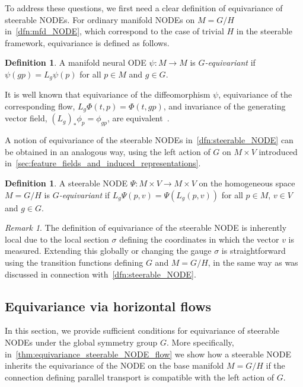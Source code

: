 \documentclass[12pt,a4paper]{article}
\numberwithin{equation}{section}
\theoremstyle{plain}
\theoremstyle{definition}
\newtheorem{definition}[theorem]{Definition}
\theoremstyle{remark}
\newtheorem{remark}[theorem]{Remark}
\begin{document}
To address these questions, we first need a clear definition of equivariance of steerable NODEs. For ordinary manifold NODEs on $M=G/H$ in~\cref{dfn:mfd_NODE}, which correspond to the case of trivial $H$ in the steerable framework, equivariance is defined as follows.

\begin{definition}\label{dfn:equivariant_mfd_NODE}
    A manifold neural ODE $\psi:M\to M$ is \textit{$G$-equivariant} if $\psi(gp)=L_g\psi(p)$ for all $p\in M$ and $g\in G$.
\end{definition}

It is well known that equivariance of the diffeomorphism $\psi$, equivariance of the corresponding flow, $L_g \Phi(t,p) = \Phi(t,gp)$, and invariance of the generating vector field, $(L_g)_*\phi_p = \phi_{gp}$, are equivalent~\cite{Kohler2020,Katsman2021,Andersdotter2025}.

A notion of equivariance of the steerable NODEs in~\cref{dfn:steerable_NODE} can be obtained in an analogous way, using the left action of $G$ on $M \times V$ introduced in~\cref{sec:feature_fields_and_induced_representations}.

\begin{definition}\label{dfn:equivariant_steerable_NODE}
    A steerable NODE $\Psi:M \times V \to M \times V$ on the homogeneous space $M=G/H$ is \textit{$G$-equivariant} if $L_g\Psi(p,v)=\Psi(L_g(p,v))$ for all $p\in M$, $v \in V$ and $g\in G$.
\end{definition}

\begin{remark}
    The definition of equivariance of the steerable NODE is inherently local due to the local section $\sigma$ defining the coordinates in which the vector $v$ is measured. Extending this globally or changing the gauge $\sigma$ is straightforward using the transition functions defining $G$ and $M=G/H$, in the same way as was discussed in connection with~\cref{dfn:steerable_NODE}. 
\end{remark}

\subsection{Equivariance via horizontal flows}
In this section, we provide sufficient conditions for equivariance of steerable NODEs under the global symmetry group $G$. More specifically, in~\cref{thm:equivariance_steerable_NODE_flow} we show how a steerable NODE inherits the equivariance of the NODE on the base manifold $M=G/H$ if the connection defining parallel transport is compatible with the left action of $G$.
\end{document}
